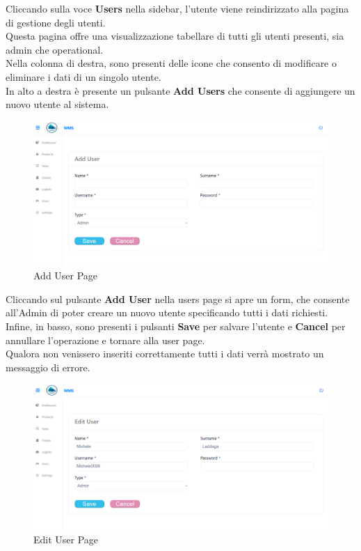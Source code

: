 Cliccando sulla voce \textbf{Users} nella sidebar, l'utente viene reindirizzato alla pagina di gestione degli utenti.\\
Questa pagina offre una visualizzazione tabellare di tutti gli utenti presenti, sia admin che operational.\\
Nella colonna di destra, sono presenti delle icone che consento di modificare o eliminare
i dati di un singolo utente.\\
In alto a destra è presente un pulsante \textbf{Add Users} che consente di aggiungere un nuovo utente al sistema.

\begin{figure}[H]
    \centering
    \includegraphics[width=\textwidth]{document/sections/img/Storyboard/addUserPage.png}
    \caption{Add User Page}
    \label{fig:addUserPages}
\end{figure}

Cliccando sul pulsante \textbf{Add User} nella users page si apre un form, che consente
all'Admin di poter creare un nuovo utente specificando tutti i dati richiesti.\\
Infine, in basso, sono presenti i pulsanti \textbf{Save} per salvare l'utente e \textbf{Cancel} per annullare l'operazione
e tornare alla user page.\\
Qualora non venissero inseriti correttamente tutti i dati verrà mostrato un messaggio di errore.

\begin{figure}[H]
    \centering
    \includegraphics[width=\textwidth]{document/sections/img/Storyboard/editUserPage.png}
    \caption{Edit User Page}
    \label{fig:editUserPage}
\end{figure}

